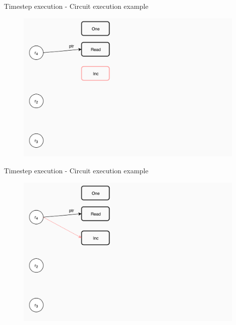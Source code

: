 \documentclass[xcolor={usenames}]{beamer}
\begin{document}
  \begin{frame}{Timestep execution - Circuit execution example}
  	\begin{figure}
  		\centering
  		\includegraphics[width=\textwidth]{../figures/example-circuit-4.png}
  	\end{figure}
  \end{frame}
  \begin{frame}{Timestep execution - Circuit execution example}
  	\begin{figure}
  		\centering
  		\includegraphics[width=\textwidth]{../figures/example-circuit-5.png}
  	\end{figure}
  \end{frame}
\end{document}
